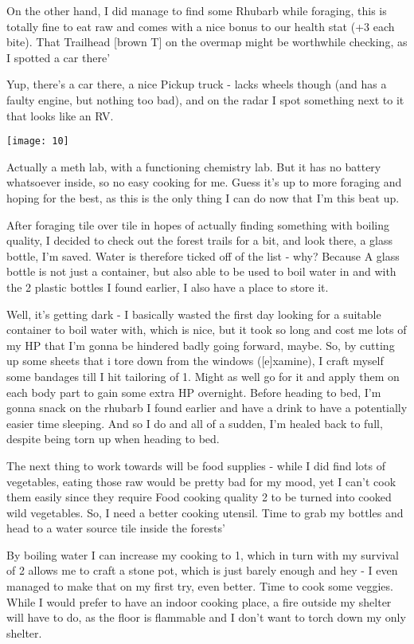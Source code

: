 On the other hand, I did manage to find some Rhubarb while foraging, this is totally fine to eat raw and comes with a nice bonus to our health stat (+3 each bite). That Trailhead [brown T] on the overmap might be worthwhile checking, as I spotted a car there'

Yup, there's a car there, a nice Pickup truck - lacks wheels though (and has a faulty engine, but nothing too bad), and on the radar I spot something next to it that looks like an RV.

\texttt{[image: 10]}

Actually a meth lab, with a functioning chemistry lab. But it has no battery whatsoever inside, so no easy cooking for me. Guess it's up to more foraging and hoping for the best, as this is the only thing I can do now that I'm this beat up.

After foraging tile over tile in hopes of actually finding something with boiling quality, I decided to check out the forest trails for a bit, and look there, a glass bottle, I'm saved. Water is therefore ticked off of the list - why? Because A glass bottle is not just a container, but also able to be used to boil water in and with the 2 plastic bottles I found earlier, I also have a place to store it.

Well, it's getting dark - I basically wasted the first day looking for a suitable container to boil water with, which is nice, but it took so long and cost me lots of my HP that I'm gonna be hindered badly going forward, maybe. So, by cutting up some sheets that i tore down from the windows ([e]xamine), I craft myself some bandages till I hit tailoring of 1. Might as well go for it and apply them on each body part to gain some extra HP overnight. Before heading to bed, I'm gonna snack on the rhubarb I found earlier and have a drink to have a potentially easier time sleeping. And so I do and all of a sudden, I'm healed back to full, despite being torn up when heading to bed.

The next thing to work towards will be food supplies - while I did find lots of vegetables, eating those raw would be pretty bad for my mood, yet I can't cook them easily since they require Food cooking quality 2 to be turned into cooked wild vegetables. So, I need a better cooking utensil. Time to grab my bottles and head to a water source tile inside the forests'

By boiling water I can increase my cooking to 1, which in turn with my survival of 2 allows me to craft a stone pot, which is just barely enough and hey - I even managed to make that on my first try, even better. Time to cook some veggies. While I would prefer to have an indoor cooking place, a fire outside my shelter will have to do, as the floor is flammable and I don't want to torch down my only shelter.

